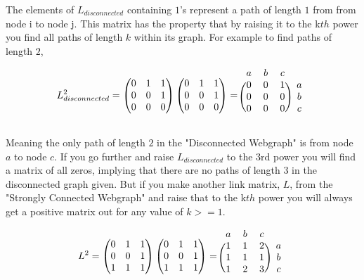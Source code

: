 \documentclass[12pt]{article}
\begin{document}
The elements of $L_{disconnected}$ containing $1$'s represent a path of length $1$ from from node i to node j. This matrix has the property that by raising it to the k$th$ power you find all paths of length $k$ within its graph. For example to find paths of length $2$,

\[
L_{disconnected}^2 =
\begin{pmatrix}
  0 & 1 & 1 \\
  0 & 0 & 1 \\
  0 & 0 & 0 \\
\end{pmatrix}
%
\begin{pmatrix}
  0 & 1 & 1 \\
  0 & 0 & 1 \\
  0 & 0 & 0 \\
\end{pmatrix}
%
=
%
\begin{blockarray}{cccc}
a & b & c \\
\begin{block}{(ccc)c}
  0 & 0 & 1 & a \\
  0 & 0 & 0 & b \\
  0 & 0 & 0 & c \\
\end{block}
\end{blockarray}
\]

Meaning the only path of length $2$ in the "Disconnected Webgraph" is from node $a$ to node $c$. If you go further and raise $L_{disconnected}$ to the $3$rd power you will find a matrix of all zeros, implying that there are no paths of length $3$ in the disconnected graph given. But if you make another link matrix, $L$, from the "Strongly Connected Webgraph" and raise that to the k$th$ power you will always get a positive matrix out for any value of $k >= 1$.

\[
L^2 =
\begin{pmatrix}
  0 & 1 & 1 \\
  0 & 0 & 1 \\
  1 & 1 & 1 \\
\end{pmatrix}
%
\begin{pmatrix}
  0 & 1 & 1 \\
  0 & 0 & 1 \\
  1 & 1 & 1 \\
\end{pmatrix}
%
=
%
\begin{blockarray}{cccc}
a & b & c \\
\begin{block}{(ccc)c}
  1 & 1 & 2 & a \\
  1 & 1 & 1 & b \\
  1 & 2 & 3 & c \\
\end{block}
\end{blockarray}
\]
\end{document}
